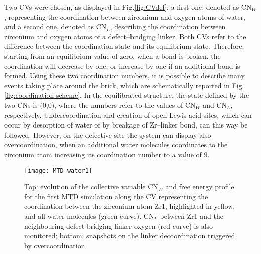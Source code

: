 Two CVs were chosen, as displayed in Fig.\ref{fig:CVdef}: a first one, denoted as CN$_W$, representing the coordination between zirconium and oxygen atoms of water, and a second one, denoted as CN$_L$, describing the coordination between zirconium and oxygen atoms of a defect--bridging linker. Both CVs refer to the difference between the coordination state and its equilibrium state. Therefore, starting from an equilibrium value of zero, when a bond is broken, the coordination will decrease by one, or increase by one if an additional bond is formed. Using these two coordination numbers, it is possible to describe many events taking place around the brick, which are schematically reported in Fig. \ref{fig:coordination-scheme}. In the equilibrated structure, the state defined by the two CNs is (0,0), where the numbers refer to the values of CN$_W$ and CN$_L$, respectively. Undercoordination and creation of open Lewis acid sites, which can occur by desorption of water of by breakage of Zr--linker bond, can this way be followed. However, on the defective site the system can display also overcoordination, when an additional water molecules coordinates to the zirconium atom increasing its coordination number to a value of 9. 
\npar
\begin{figure}[!htbp]
	\centering
	\texttt{[image: MTD-water1]}
	\caption{Top: evolution of the collective variable CN$_W$ and free energy profile for the first MTD simulation along the CV representing the coordination between the zirconium atom Zr1, highlighted in yellow, and all water molecules (green curve). CN$_L$ between Zr1 and the neighbouring defect-bridging linker oxygen (red curve) is also monitored; bottom: snapshots on the linker decoordination triggered by overcoordination}
	\label{fig:MTD-water1}
\end{figure}
